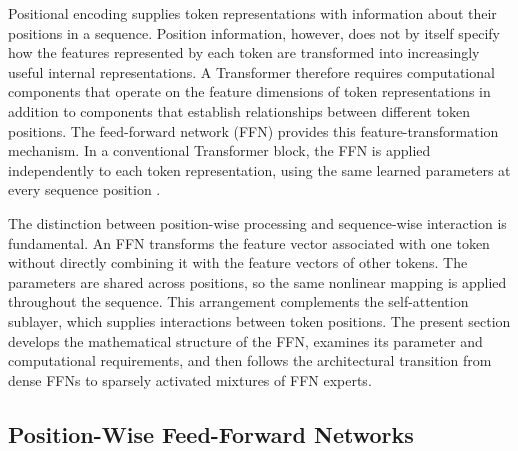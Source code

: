 
Positional encoding supplies token representations with information about
their positions in a sequence. Position information, however, does not by
itself specify how the features represented by each token are transformed
into increasingly useful internal representations. A Transformer therefore
requires computational components that operate on the feature dimensions of
token representations in addition to components that establish relationships
between different token positions. The feed-forward network (FFN) provides
this feature-transformation mechanism. In a conventional Transformer block,
the FFN is applied independently to each token representation, using the
same learned parameters at every sequence position
\parencite{dai2024deepseekmoe,cai2025survey}.

The distinction between position-wise processing and sequence-wise
interaction is fundamental. An FFN transforms the feature vector associated
with one token without directly combining it with the feature vectors of
other tokens. The parameters are shared across positions, so the same
nonlinear mapping is applied throughout the sequence. This arrangement
complements the self-attention sublayer, which supplies interactions between
token positions. The present section develops the mathematical structure of
the FFN, examines its parameter and computational requirements, and then
follows the architectural transition from dense FFNs to sparsely activated
mixtures of FFN experts.

\subsection{Position-Wise Feed-Forward Networks}
\label{subsec:ffn-position-wise}

